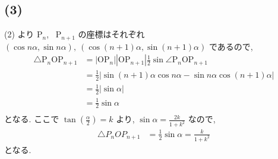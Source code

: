 \documentclass[a4j, 11pt]{jarticle}
\begin{document}
%
%






%
%







%
%






%
%

\subsection*{(3)}
 (2) より P$_n$, \ P$_{n + 1}$ の座標はそれぞれ $(\cos n \alpha, \sin n \alpha), \ (\cos (n + 1) \alpha, \sin (n + 1) \alpha)$ であるので,
  \begin{align*}
   \triangle \textrm{P}_n \textrm{O} \textrm{P}_{n + 1} &= |\textrm{O} \textrm{P}_n| |\textrm{O} \textrm{P}_{n + 1}| \frac{1}{2} \sin \angle \textrm{P}_n \textrm{O} \textrm{P}_{n + 1} \\
                                   &= \frac{1}{2} \left| \sin (n + 1) \alpha \cos n \alpha - \sin n \alpha \cos (n + 1) \alpha \right| \\
                                   &= \frac{1}{2} \left| \sin \alpha \right| \\
                                   &= \frac{1}{2} \sin \alpha \\
  \end{align*}
 となる. ここで $\displaystyle \tan \left( \frac{\alpha}{2} \right) = k$ より, $\sin \alpha = \displaystyle \frac{2k}{1 + k^2}$ なので, 
  \begin{align*}
   \triangle P_n O P_{n + 1} &= \frac{1}{2} \sin \alpha = \frac{k}{1 + k^2}
  \end{align*}
 となる.

%
%





%
%






%
%
\end{document}

